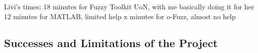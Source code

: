 
Livi's times:
18 minutes for Fuzzy Toolkit UoN, with me basically doing it for her
12 minutes for MATLAB, limited help
x minutes for o-Fuzz, almost no help


\subsection{Successes and Limitations of the Project}

